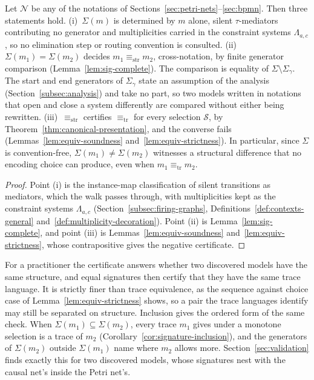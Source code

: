 \begin{theorem}\label{thm:signature-equivalence}
  Let $\mathcal{N}$ be any of the notations of Sections~\ref{sec:petri-nets}--\ref{sec:bpmn}.
  Then three statements hold.
  (i)~$\Sigma(m)$ is determined by $m$ alone, silent $\tau$-mediators contributing no generator and
  multiplicities carried in the constraint systems $\Lambda_{a,c}$, so no elimination step or routing convention is
  consulted. (ii)~$\Sigma(m_1)=\Sigma(m_2)$ decides $m_1\equiv_{\mathrm{str}}m_2$, cross-notation, by
  finite generator comparison (Lemma~\ref{lem:sig-complete}). The comparison is equality
  of $\Sigma\setminus\Sigma_\gamma$. The start and end generators of $\Sigma_\gamma$ state an
  assumption of the analysis (Section~\ref{subsec:analysis}) and take no part, so two models written
  in notations that open and close a system differently are compared without either being
  rewritten. (iii)~$\equiv_{\mathrm{str}}$ certifies $\equiv_{\mathrm{tr}}$ for every selection
  $\mathcal{S}$, by Theorem~\ref{thm:canonical-presentation}, and the converse fails
  (Lemmas~\ref{lem:equiv-soundness} and~\ref{lem:equiv-strictness}). In particular, since $\Sigma$ is convention-free,
  $\Sigma(m_1)\ne\Sigma(m_2)$ witnesses a structural difference that no encoding choice
  can produce, even when $m_1\equiv_{\mathrm{tr}}m_2$.
\end{theorem}

\begin{proof}
  Point (i) is the instance-map classification of silent transitions as mediators, which the walk
  passes through, with multiplicities kept as the constraint systems $\Lambda_{a,c}$
  (Section~\ref{subsec:firing-graphs}, Definitions~\ref{def:contexts-general}
  and~\ref{def:multiplicity-decoration}). Point (ii) is
  Lemma~\ref{lem:sig-complete}, and point (iii) is Lemmas~\ref{lem:equiv-soundness}
  and~\ref{lem:equiv-strictness}, whose contrapositive gives the negative certificate.
\end{proof}

For a practitioner the certificate answers whether two discovered models have the same structure,
and equal signatures then certify that they have the same trace language. It is strictly finer
than trace equivalence, as the sequence against choice case of
Lemma~\ref{lem:equiv-strictness} shows, so a pair the trace languages identify may still be
separated on structure. Inclusion gives the ordered form of the same check. When
$\Sigma(m_1)\subseteq\Sigma(m_2)$, every trace $m_1$ gives under a monotone selection is a trace of
$m_2$ (Corollary~\ref{cor:signature-inclusion}), and the generators of $\Sigma(m_2)$ outside
$\Sigma(m_1)$ name where $m_2$ allows more. Section~\ref{sec:validation} finds exactly this for two
discovered models, whose signatures nest with the causal net's inside the Petri net's.

